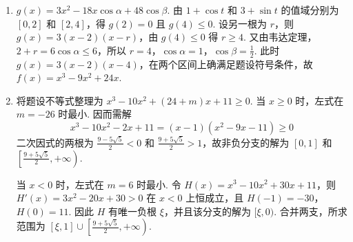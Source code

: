 \begin{solution}
\begin{enumerate}
\item \(g(x)=3x^2-18x\cos\alpha+48\cos\beta\). 由 \(1+\cos t\) 和 \(3+\sin t\) 的值域分别为 \([0,2]\) 和 \([2,4]\)，得 \(g(2)=0\) 且 \(g(4)\leqslant0\). 设另一根为 \(r\)，则 \(g(x)=3(x-2)(x-r)\)，由 \(g(4)\leqslant0\) 得 \(r\geqslant4\). 又由韦达定理，\(2+r=6\cos\alpha\leqslant6\)，所以 \(r=4\)，\(\cos\alpha=1\)，\(\cos\beta=\frac12\). 此时 \(g(x)=3(x-2)(x-4)\)，在两个区间上确满足题设符号条件，故 \(f(x)=x^3-9x^2+24x\).
\item 将题设不等式整理为 \(x^3-10x^2+(24+m)x+11\geqslant0\). 当 \(x\geqslant0\) 时，左式在 \(m=-26\) 时最小. 因而需解
\[
x^3-10x^2-2x+11=(x-1)(x^2-9x-11)\geqslant0
\]
二次因式的两根为 \(\frac{9-5\sqrt5}{2}<0\) 和 \(\frac{9+5\sqrt5}{2}>1\)，故非负分支的解为 \([0,1]\) 和 \(\left[\frac{9+5\sqrt5}{2},+\infty\right)\).

当 \(x<0\) 时，左式在 \(m=6\) 时最小. 令 \(H(x)=x^3-10x^2+30x+11\)，则 \(H'(x)=3x^2-20x+30>0\) 在 \(x<0\) 上恒成立，且 \(H(-1)=-30\)，\(H(0)=11\). 因此 \(H\) 有唯一负根 \(\xi\)，并且该分支的解为 \([\xi,0)\). 合并两支，所求范围为 \([\xi,1]\cup\left[\frac{9+5\sqrt5}{2},+\infty\right)\).
\end{enumerate}
\end{solution}
